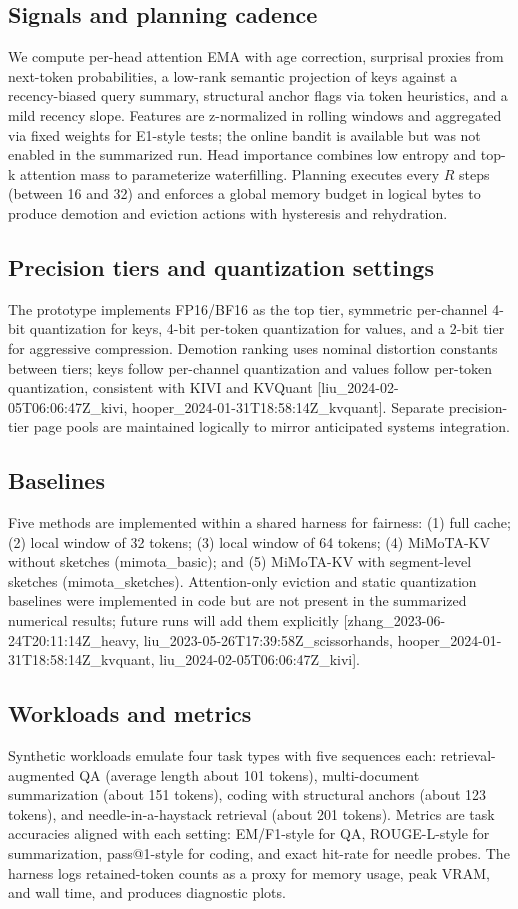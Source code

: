 \documentclass{article} %
\begin{document}
\subsection{Signals and planning cadence}
We compute per-head attention EMA with age correction, surprisal proxies from next-token probabilities, a low-rank semantic projection of keys against a recency-biased query summary, structural anchor flags via token heuristics, and a mild recency slope. Features are z-normalized in rolling windows and aggregated via fixed weights for E1-style tests; the online bandit is available but was not enabled in the summarized run. Head importance combines low entropy and top-k attention mass to parameterize waterfilling. Planning executes every \(R\) steps (between 16 and 32) and enforces a global memory budget in logical bytes to produce demotion and eviction actions with hysteresis and rehydration.

\subsection{Precision tiers and quantization settings}
The prototype implements FP16/BF16 as the top tier, symmetric per-channel 4-bit quantization for keys, 4-bit per-token quantization for values, and a 2-bit tier for aggressive compression. Demotion ranking uses nominal distortion constants between tiers; keys follow per-channel quantization and values follow per-token quantization, consistent with KIVI and KVQuant [liu\_2024-02-05T06:06:47Z\_kivi, hooper\_2024-01-31T18:58:14Z\_kvquant]. Separate precision-tier page pools are maintained logically to mirror anticipated systems integration.

\subsection{Baselines}
Five methods are implemented within a shared harness for fairness: (1) full cache; (2) local window of 32 tokens; (3) local window of 64 tokens; (4) MiMoTA-KV without sketches (mimota\_basic); and (5) MiMoTA-KV with segment-level sketches (mimota\_sketches). Attention-only eviction and static quantization baselines were implemented in code but are not present in the summarized numerical results; future runs will add them explicitly [zhang\_2023-06-24T20:11:14Z\_heavy, liu\_2023-05-26T17:39:58Z\_scissorhands, hooper\_2024-01-31T18:58:14Z\_kvquant, liu\_2024-02-05T06:06:47Z\_kivi].

\subsection{Workloads and metrics}
Synthetic workloads emulate four task types with five sequences each: retrieval-augmented QA (average length about 101 tokens), multi-document summarization (about 151 tokens), coding with structural anchors (about 123 tokens), and needle-in-a-haystack retrieval (about 201 tokens). Metrics are task accuracies aligned with each setting: EM/F1-style for QA, ROUGE-L-style for summarization, pass@1-style for coding, and exact hit-rate for needle probes. The harness logs retained-token counts as a proxy for memory usage, peak VRAM, and wall time, and produces diagnostic plots.
\end{document}
